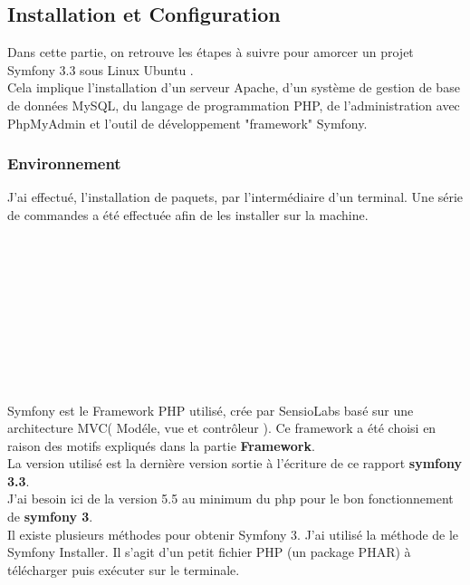 \documentclass[12pt]{article}
\begin{document}
\subsection{Installation et Configuration}
Dans cette partie, on retrouve  les étapes à suivre pour amorcer un  projet Symfony 3.3 sous Linux Ubuntu .\\
 Cela implique l'installation d'un serveur Apache, d'un système de gestion de base de données MySQL, du langage de programmation PHP, de l'administration avec PhpMyAdmin et l'outil de développement "framework" Symfony.\\ 


\subsubsection{Environnement}
J'ai effectué, l'installation de paquets, par l'intermédiaire d'un terminal. Une série de commandes a été effectuée afin de les installer sur la machine.
\\

\\

\\

\\

\\

\\

\\

\\

\\

   
     
\\
\\
Symfony est le Framework PHP utilisé, crée par SensioLabs basé sur une
architecture MVC( Modéle, vue et contrôleur ). Ce framework a été choisi
en raison des motifs expliqués dans la partie \textbf{Framework}.\\
La version utilisé est la dernière version sortie à l’écriture de ce rapport \textbf{symfony 3.3}.
\\ 
J'ai besoin ici de la version 5.5 au minimum du php pour le bon fonctionnement de \textbf{symfony 3}.\\
Il existe plusieurs méthodes pour obtenir Symfony 3. J'ai utilisé la méthode de le Symfony Installer. Il s'agit d'un petit fichier PHP (un package PHAR) à télécharger puis exécuter sur le terminale.\\
\end{document}
